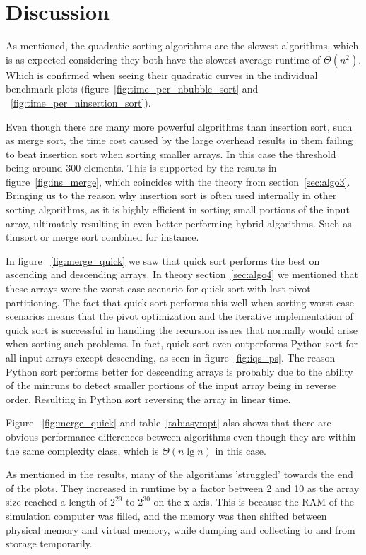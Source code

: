 \documentclass[sigconf, nonacm, natbib, screen, balance=False]{acmart}
\begin{document}
\section{Discussion}\label{sec:discussion}

As mentioned, the quadratic sorting algorithms are the slowest algorithms, which is as expected considering they both have the slowest average runtime of $\Theta(n^2)$. Which is confirmed when seeing their quadratic curves in the individual benchmark-plots (figure~\ref{fig:time_per_nbubble_sort} and ~\ref{fig:time_per_ninsertion_sort}). 

Even though there are many more powerful algorithms than insertion sort, such as merge sort, the time cost caused by the large overhead results in them failing to beat insertion sort when sorting smaller arrays. In this case the threshold being around 300 elements. This is supported by the results in figure~\ref{fig:ins_merge}, which coincides with the theory from section~\ref{sec:algo3}. Bringing us to the reason why insertion sort is often used internally in other sorting algorithms, as it is highly efficient in sorting small portions of the input array, ultimately resulting in even better performing hybrid algorithms. Such as timsort or merge sort combined for instance.

In figure ~\ref{fig:merge_quick} we saw that quick sort performs the best on ascending and descending arrays. In theory section~\ref{sec:algo4} we mentioned that these arrays were the worst case scenario for quick sort with last pivot partitioning. The fact that quick sort performs this well when sorting worst case scenarios means that the pivot optimization and the iterative implementation of quick sort is successful in handling the recursion issues that normally would arise when sorting such problems. In fact, quick sort even outperforms Python sort for all input arrays except descending, as seen in figure~\ref{fig:iqs_ps}. The reason Python sort performs better for descending arrays is probably due to the ability of the minruns to detect smaller portions of the input array being in reverse order. Resulting in Python sort reversing the array in linear time. 

Figure ~\ref{fig:merge_quick} and table~\ref{tab:asympt} also shows that there are obvious performance differences between algorithms even though they are within the same complexity class, which is $\Theta(n\lg n)$ in this case.

As mentioned in the results, many of the algorithms 'struggled' towards the end of the plots. They increased in runtime by a factor between 2 and 10 as the array size reached a length of $2^{29}$ to $2^{30}$ on the x-axis. This is because the RAM of the simulation computer was filled, and the memory was then shifted between physical memory and virtual memory, while dumping and collecting to and from storage temporarily.
\end{document}
